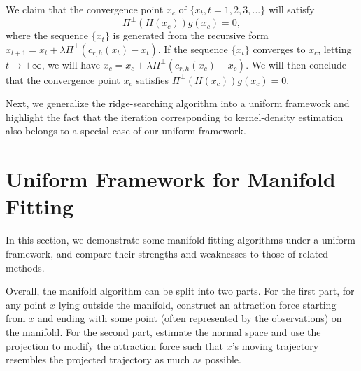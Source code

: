 \documentclass[aos,preprint]{imsart}
\theoremstyle{remark}
\begin{document}
\begin{appendix}
We claim that the convergence point $x_c$ of $\{x_t, t=1,2,3,...\}$ will satisfy 
\[
\Pi^{\perp}(H(x_c)) g(x_c)=0,
\] where the sequence $\{x_t\}$ is generated from the recursive form $x_{t+1} = x_t + \lambda \Pi^\perp (c_{r,h}(x_t) - x_t)$. If the sequence $\{x_t\}$ converges to $x_c$, letting $t \rightarrow +\infty$, we will have $x_c = x_c + \lambda \Pi^\perp (c_{r,h}(x_c) - x_c)$. We will then conclude that the convergence point $x_c$ satisfies $\Pi^{\perp}(H(x_c)) g(x_c)=0$.



Next, we generalize the ridge-searching algorithm into a uniform framework and highlight the fact that the iteration corresponding to kernel-density estimation also belongs to a special case of our uniform framework.

\section{Uniform Framework for Manifold Fitting}

In this section, we demonstrate some manifold-fitting algorithms under a uniform framework, and compare their strengths and weaknesses to those of related methods.

Overall, the manifold algorithm can be split into two parts. For the first part, for any point ${x}$ lying outside the manifold, construct an attraction force starting from ${x}$ and ending with some point (often represented by the observations) on the manifold. For the second part, estimate the normal space and use the projection to modify the attraction force such that $x$'s moving trajectory resembles the projected trajectory as much as possible.



\end{appendix}
\end{document}
